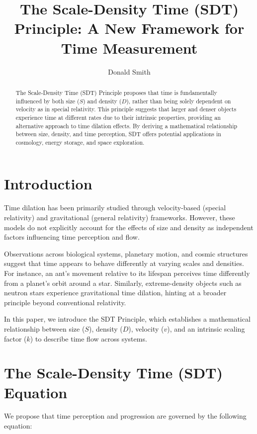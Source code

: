 \documentclass[aps,prl,twocolumn,superscriptaddress]{revtex4-2}
\begin{document}
\title{The Scale-Density Time (SDT) Principle: A New Framework for Time Measurement}

\author{Donald Smith}

\begin{abstract}
The Scale-Density Time (SDT) Principle proposes that time is fundamentally influenced by both size ($S$) and density ($D$), rather than being solely dependent on velocity as in special relativity. This principle suggests that larger and denser objects experience time at different rates due to their intrinsic properties, providing an alternative approach to time dilation effects. By deriving a mathematical relationship between size, density, and time perception, SDT offers potential applications in cosmology, energy storage, and space exploration.
\end{abstract}

\maketitle

\section{Introduction}
Time dilation has been primarily studied through velocity-based (special relativity) and gravitational (general relativity) frameworks. However, these models do not explicitly account for the effects of size and density as independent factors influencing time perception and flow.

Observations across biological systems, planetary motion, and cosmic structures suggest that time appears to behave differently at varying scales and densities. For instance, an ant’s movement relative to its lifespan perceives time differently from a planet’s orbit around a star. Similarly, extreme-density objects such as neutron stars experience gravitational time dilation, hinting at a broader principle beyond conventional relativity.

In this paper, we introduce the SDT Principle, which establishes a mathematical relationship between size ($S$), density ($D$), velocity ($v$), and an intrinsic scaling factor ($k$) to describe time flow across systems.

\section{The Scale-Density Time (SDT) Equation}
We propose that time perception and progression are governed by the following equation:
\end{document}
